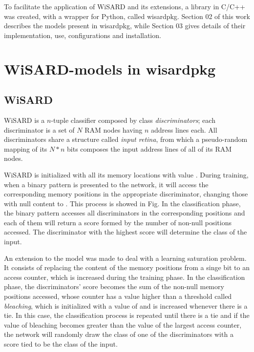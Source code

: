 \documentclass[12pt]{article}
\begin{document}
To facilitate the application of WiSARD and its extensions, a library in C/C++ was created, with a wrapper for Python, called wisardpkg. Section 02 of this work describes the models present in wisardpkg, while Section 03 gives details of their implementation, use, configurations and installation.

\section{WiSARD-models in wisardpkg}

\subsection{WiSARD}

WiSARD\cite{aleksander} is a $n$-tuple classifier composed by class \textit{discriminators}; each discriminator is a set of $N$ RAM nodes having $n$ address lines each. All discriminators share a structure called \textit{input retina}, from which a pseudo-random mapping of its $N * n$ bits composes the input address lines of all of its RAM nodes.

WiSARD is initialized with all its memory locations with value . During training, when a binary pattern is presented to the network, it will access the corresponding memory positions in the appropriate discriminator, changing those with null content to . This process is showed in Fig. In the classification phase, the binary pattern accesses all discriminators in the corresponding positions and each of them will return a score formed by the number of non-null positions accessed. The discriminator with the highest score will determine the class of the input.

An extension to the model was made to deal with a learning saturation problem. It consists of replacing the content of the memory positions from a singe bit to an access counter, which is increased during the training phase. In the classification phase, the discriminators' score becomes the sum of the non-null memory positions accessed, whose counter has a value higher than a threshold called \textit{bleaching}\cite{grieco2010}, which is initialized with a value of  and is increased whenever there is a tie. In this case, the classification process is repeated until there is a tie and if the value of bleaching becomes greater than the value of the largest access counter, the network will randomly draw the class of one of the discriminators with a score tied to be the class of the input.
\end{document}
